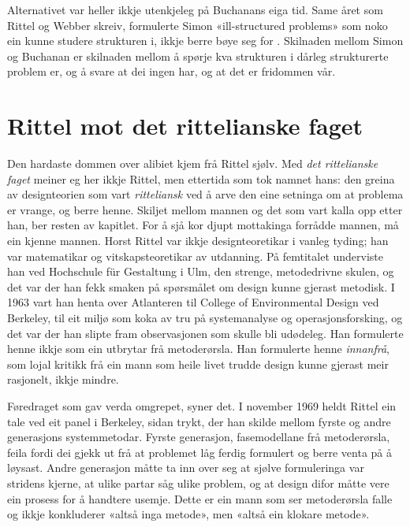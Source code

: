 Alternativet var heller ikkje utenkjeleg på Buchanans eiga tid. Same året som Rittel og Webber skreiv, formulerte Simon «ill-structured problems» som noko ein kunne studere strukturen i, ikkje berre bøye seg for \autocite{simon1973illstructured}. Skilnaden mellom Simon og Buchanan er skilnaden mellom å spørje kva strukturen i dårleg strukturerte problem er, og å svare at dei ingen har, og at det er fridommen vår.

\section{Rittel mot det rittelianske faget}

Den hardaste dommen over alibiet kjem frå Rittel sjølv. Med \emph{det rittelianske faget} meiner eg her ikkje Rittel, men ettertida som tok namnet hans: den greina av designteorien som vart \emph{ritteliansk} ved å arve den eine setninga om at problema er vrange, og berre henne. Skiljet mellom mannen og det som vart kalla opp etter han, ber resten av kapitlet. For å sjå kor djupt mottakinga forrådde mannen, må ein kjenne mannen. Horst Rittel var ikkje designteoretikar i vanleg tyding; han var matematikar og vitskapsteoretikar av utdanning. På femtitalet underviste han ved Hochschule für Gestaltung i Ulm, den strenge, metodedrivne skulen, og det var der han fekk smaken på spørsmålet om design kunne gjerast metodisk. I 1963 vart han henta over Atlanteren til College of Environmental Design ved Berkeley, til eit miljø som koka av tru på systemanalyse og operasjonsforsking, og det var der han slipte fram observasjonen som skulle bli udødeleg. Han formulerte henne ikkje som ein utbrytar frå metoderørsla. Han formulerte henne \emph{innanfrå}, som lojal kritikk frå ein mann som heile livet trudde design kunne gjerast meir rasjonelt, ikkje mindre.

Føredraget som gav verda omgrepet, syner det. I november 1969 heldt Rittel ein tale ved eit panel i Berkeley, sidan trykt, der han skilde mellom fyrste og andre generasjons systemmetodar. Fyrste generasjon, fasemodellane frå metoderørsla, feila fordi dei gjekk ut frå at problemet låg ferdig formulert og berre venta på å løysast. Andre generasjon måtte ta inn over seg at sjølve formuleringa var stridens kjerne, at ulike partar såg ulike problem, og at design difor måtte vere ein prosess for å handtere usemje. Dette er ein mann som ser metoderørsla falle og ikkje konkluderer «altså inga metode», men «altså ein klokare metode».

